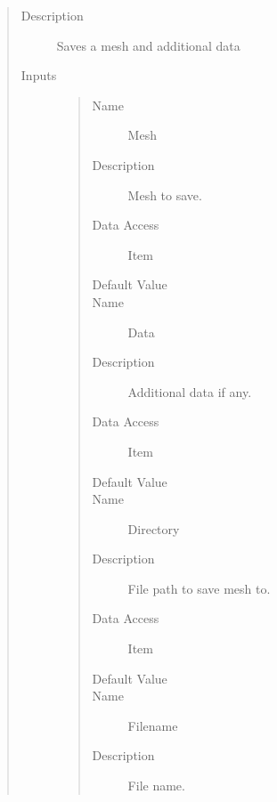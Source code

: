 \documentclass[letterpaper,10pt,english]{sphinxmanual}
\begin{document}
\begin{quote}\begin{description}
\item[{Description}] \leavevmode
Saves a mesh and additional data

\item[{Inputs}] \leavevmode\begin{quote}\begin{description}
\item[{Name}] \leavevmode
Mesh

\item[{Description}] \leavevmode
Mesh to save.

\item[{Data Access}] \leavevmode
Item

\item[{Default Value}] \leavevmode
{}

\item[{Name}] \leavevmode
Data

\item[{Description}] \leavevmode
Additional data if any.

\item[{Data Access}] \leavevmode
Item

\item[{Default Value}] \leavevmode
{}

\item[{Name}] \leavevmode
Directory

\item[{Description}] \leavevmode
File path to save mesh to.

\item[{Data Access}] \leavevmode
Item

\item[{Default Value}] \leavevmode
{}

\item[{Name}] \leavevmode
Filename

\item[{Description}] \leavevmode
File name.


\end{description}
\end{quote}
\end{description}
\end{quote}
\end{document}
